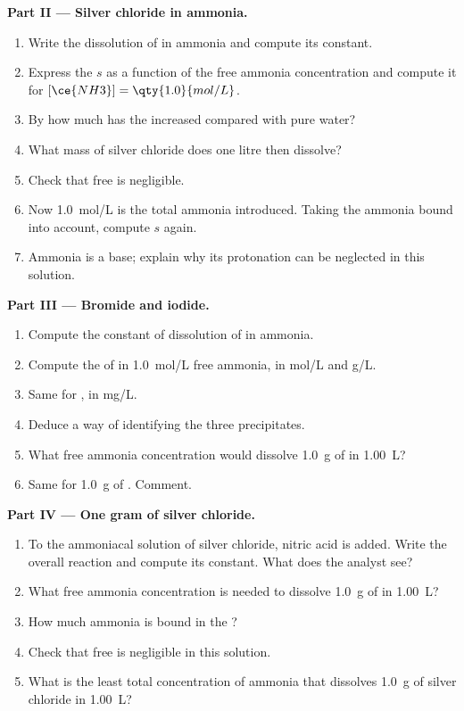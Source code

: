 \begin{problem}
\medskip
\noindent\textbf{Part II --- Silver chloride in ammonia.}
\begin{enumerate}[resume]
  \item Write the dissolution of  in ammonia and compute its
        constant.
  \item Express the  $s$ as a function of the free ammonia
        concentration and compute it for $[\ce{NH3}] = \qty{1.0}{mol/L}$.
  \item By how much has the  increased compared with pure
        water?
  \item What mass of silver chloride does one litre then dissolve?
  \item Check that free  is negligible.
  \item Now \qty{1.0}{mol/L} is the total ammonia introduced. Taking the
        ammonia bound into account, compute $s$ again.
  \item Ammonia is a base; explain why its protonation can be neglected in
        this solution.
\end{enumerate}

\medskip
\noindent\textbf{Part III --- Bromide and iodide.}
\begin{enumerate}[resume]
  \item Compute the constant of dissolution of  in ammonia.
  \item Compute the  of  in \qty{1.0}{mol/L} free
        ammonia, in \unit{mol/L} and \unit{g/L}.
  \item Same for , in \unit{mg/L}.
  \item Deduce a way of identifying the three precipitates.
  \item What free ammonia concentration would dissolve \qty{1.0}{g} of
         in \qty{1.00}{L}?
  \item Same for \qty{1.0}{g} of . Comment.
\end{enumerate}

\medskip
\noindent\textbf{Part IV --- One gram of silver chloride.}
\begin{enumerate}[resume]
  \item To the ammoniacal solution of silver chloride, nitric acid is
        added. Write the overall reaction and compute its constant. What
        does the analyst see?
  \item What free ammonia concentration is needed to dissolve \qty{1.0}{g}
        of  in \qty{1.00}{L}?
  \item How much ammonia is bound in the ?
  \item Check that free  is negligible in this solution.
  \item What is the least total concentration of ammonia that dissolves
        \qty{1.0}{g} of silver chloride in \qty{1.00}{L}?
\end{enumerate}
\end{problem}
